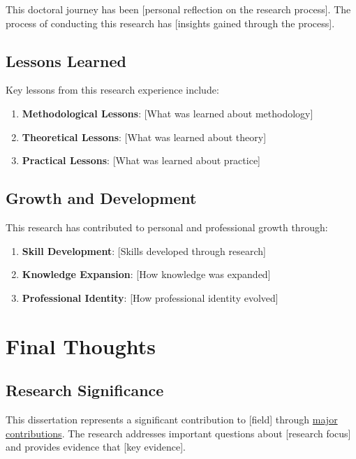 \documentclass[
  12pt,
  letterpaper,
  12pt,
  letterpaper,
  oneside]{report}
\providecommand{\tightlist}{%
  \setlength{\itemsep}{0pt}\setlength{\parskip}{0pt}}
\begin{document}
This doctoral journey has been {[}personal reflection on the research
process{]}. The process of conducting this research has {[}insights
gained through the process{]}.

\subsection{Lessons Learned}\label{lessons-learned}

Key lessons from this research experience include:

\begin{enumerate}
\def\labelenumi{\arabic{enumi}.}
\tightlist
\item
  \textbf{Methodological Lessons}: {[}What was learned about
  methodology{]}
\item
  \textbf{Theoretical Lessons}: {[}What was learned about theory{]}
\item
  \textbf{Practical Lessons}: {[}What was learned about practice{]}
\end{enumerate}

\subsection{Growth and Development}\label{growth-and-development}

This research has contributed to personal and professional growth
through:

\begin{enumerate}
\def\labelenumi{\arabic{enumi}.}
\tightlist
\item
  \textbf{Skill Development}: {[}Skills developed through research{]}
\item
  \textbf{Knowledge Expansion}: {[}How knowledge was expanded{]}
\item
  \textbf{Professional Identity}: {[}How professional identity
  evolved{]}
\end{enumerate}

\section{Final Thoughts}\label{final-thoughts-1}

\subsection{Research Significance}\label{research-significance}

This dissertation represents a significant contribution to {[}field{]}
through \hyperref[major-contributions]{major contributions}. The
research addresses important questions about {[}research focus{]} and
provides evidence that {[}key evidence{]}.
\end{document}
